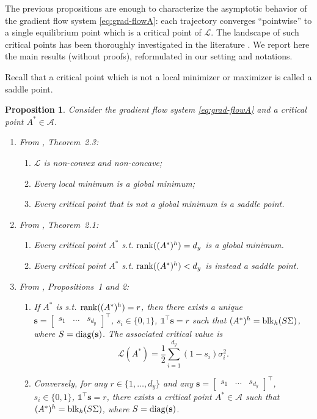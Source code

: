 \documentclass{article}
\newtheorem{proposition}{Proposition}
\def\rank{{\rm rank}}
\def\block{{\rm blk}}
\newcommand{\1}{\mathds{1}}
\newcommand{\beq}{\begin{equation}}
\newcommand{\eeq}{\end{equation}}
\newcommand{\benu}{\begin{enumerate}}
\newcommand{\eenu}{\end{enumerate}}
\begin{document}
The previous propositions are enough to characterize the asymptotic behavior of the gradient flow system \eqref{eq:grad-flowA}: each trajectory converges ``pointwise'' to a single equilibrium point which is a critical point of $ \mathcal{L}$.
The landscape of such critical points has been thoroughly investigated in the literature \cite{baldi1989neural,kawaguchi2016deep,yun2017global,zhou2017critical,chitour2018geometric,achour2021loss,trager2019pure}. We report here the main results (without proofs), reformulated in our setting and notations. 


Recall that a critical point which is not a local minimizer or maximizer is called a saddle point. 


\begin{proposition} 
\label{prop:critical-point-lit}
Consider the gradient flow system \eqref{eq:grad-flowA} and a critical point $ A^\ast \in \mathcal{A}$.
\benu
\item From \cite{kawaguchi2016deep}, Theorem~2.3:
\begin{enumerate}
\item $ \mathcal{L} $ is non-convex and non-concave;
\item Every local minimum is a global minimum;
\item Every critical point that is not a global minimum is a saddle point.
\end{enumerate}
\item From \cite{yun2017global}, Theorem~2.1:
\begin{enumerate}
\item Every critical point $ A^\ast $ s.t. $ \rank((A^\ast)^h) =d_y $ is a global minimum. \item Every critical point $ A^\ast $ s.t. $ \rank((A^\ast)^h) < d_y $ is instead a saddle point.
\end{enumerate}
\item From \cite{achour2021loss}, Propositions~1 and 2:
\benu
\item If $ A^\ast$ 
is s.t. $ \rank((A^\ast)^h) = r $, then there exists a unique $ \mathbf{s}=\begin{bmatrix} s_1 & \ldots & s_{d_y} \end{bmatrix}^\top $, $ s_i \in \{0, 1 \}$, $ \1^\top \mathbf{s} = r $ such that $ (A^\ast)^h =\block_h(S \Sigma) $, where $ S={\rm diag}(\mathbf{s})$. 
The associated critical value is 
\beq
\mathcal{L}(A^\ast) = \frac{1}{2} \sum_{i=1}^{d_y} (1- s_i) \sigma_i^2.
\label{eq:critical-values}
\eeq
\item Conversely, for any $ r \in \{ 1, \ldots, d_y \}$ 
and any $ \mathbf{s}=\begin{bmatrix} s_1 & \ldots & s_{d_y} \end{bmatrix}^\top $, $ s_i \in \{0, 1 \}$, $   \1^\top \mathbf{s} = r $, there exists a critical point $ A^\ast \in \mathcal{A} $ such that $ (A^\ast)^h =\block_h(S \Sigma) $, where $ S={\rm diag}(\mathbf{s})$. 
\eenu
\eenu

\end{proposition}
\end{document}

